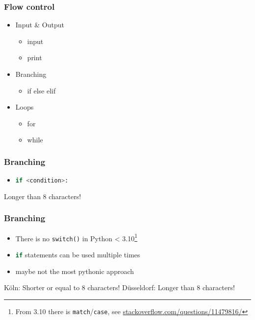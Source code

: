 \documentclass[english]{beamer}
\newcommand{\ta}[1]{\textattachfile[color=1 0 0]{#1}{Code}}
\begin{document}
\begin{frame}
\frametitle{Flow control}

\begin{itemize}
\item Input \& Output \checkmark
\begin{itemize}
	\item input
	\item print
\end{itemize}

\item Branching
\begin{itemize}
	\item if else elif
\end{itemize}

\item Loops
\begin{itemize}
	\item for
	\item while
\end{itemize}

\end{itemize}
\end{frame}

\begin{frame}[containsverbatim]
\frametitle{Branching}

\begin{itemize}
\item \lstinline[language={Python}]{if <condition>:}
\end{itemize}



\begin{ausgabe}
Longer than 8 characters!
\end{ausgabe}
\end{frame}

\begin{frame}[containsverbatim]
\frametitle{Branching}

\begin{itemize}
\item There is no \texttt{switch()} in Python < 3.10\footnote{From 3.10 there is \texttt{match}/\texttt{case}, see \url{stackoverflow.com/questions/11479816/}}
\item \lstinline[language={Python}]{if} statements can be used multiple times
\item maybe not the most pythonic approach
\end{itemize}



\begin{ausgabe}
Köln: Shorter or equal to 8 characters!
Düsseldorf: Longer than 8 characters!
\end{ausgabe}
\end{frame}
\end{document}
